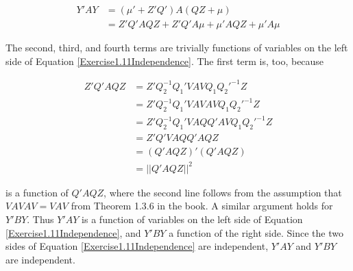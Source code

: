 \documentclass{article}
\begin{document}
\begin{align*}
Y'AY &= (\mu'+Z'Q')A(QZ+\mu) \\
&= Z'Q'AQZ + Z'Q'A\mu + \mu'AQZ + \mu'A\mu
\end{align*}

The second, third, and fourth terms are trivially functions of variables on the left side of Equation \ref{Exercise1.11Independence}. The first term is, too, because

\begin{align*}
Z'Q'AQZ &= Z'Q_2^{-1}Q_1'VAVQ_1Q_2'^{-1}Z \\
&= Z'Q_2^{-1}Q_1'VAVAVQ_1Q_2'^{-1}Z \\
&= Z'Q_2^{-1}Q_1'VAQQ'AVQ_1Q_2'^{-1}Z \\
&= Z'Q'VAQQ'AQZ \\
&= (Q'AQZ)'(Q'AQZ) \\
&= ||Q'AQZ||^2
\end{align*}

is a function of $Q'AQZ$, where the second line follows from the assumption that $VAVAV=VAV$ from Theorem 1.3.6 in the book. A similar argument holds for $Y'BY$. Thus $Y'AY$ is a function of variables on the left side of Equation \ref{Exercise1.11Independence}, and $Y'BY$ a function of the right side. Since the two sides of Equation \ref{Exercise1.11Independence} are independent, $Y'AY$ and $Y'BY$ are independent.
\end{document}
